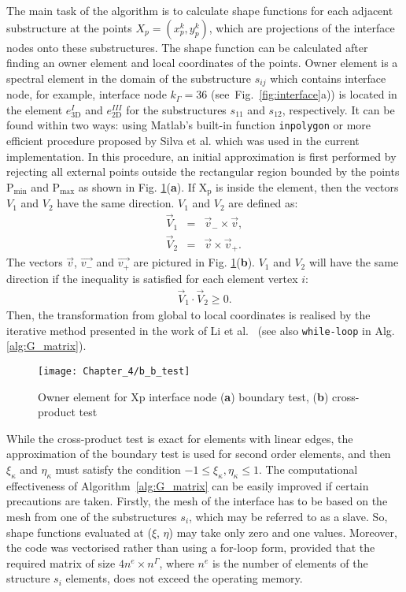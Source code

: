 The main task of the algorithm is to calculate shape functions for each adjacent substructure at the points \(X_p=(x_p^k,y_p^k)\), which are projections of the interface nodes onto these substructures.
The shape function can be calculated after finding an owner element and local coordinates of the points.
Owner element is a spectral element in the domain of the substructure \(s_{ij}\) which contains interface node, for example, interface node \(k_\Gamma=36\) (see~Fig.~\ref{fig:interface}a)) is located in the element \(e^{I}_{3\mathrm{D}}\) and \(e^{III}_{2\mathrm{D}}\) for the substructures \(s_{11}\) and \(s_{12}\), respectively.
It can be found within two ways: using Matlab's built-in function \verb+inpolygon+ or more efficient procedure proposed by Silva et al. \cite{silva2009exact} which was used in the current implementation.
In this procedure, an initial approximation is first performed by rejecting all external points outside the rectangular region bounded by the points \(\mathrm{P_{min}}\) and \(\mathrm{P_{max}}\) as shown in Fig. \ref{fig:b_b_test}(\textbf{a}).
If \(\mathrm{X_p}\) is inside the element, then the vectors \(V_1\) and \(V_2\) have the same direction.
\(V_1\) and \(V_2\) are defined as:
\begin{eqnarray}
	\vec{V}_1 & = & \vec{v}_-\times \vec{v},\\
	\vec{V}_2 & = & \vec{v}\times \vec{v}_+.
\label{eq:v_vectors}
\end{eqnarray}
The vectors \(\vec{v}\), \(\vec{v_-}\) and \(\vec{v_+}\) are pictured in Fig. \ref{fig:b_b_test}(\textbf{b}). \(V_1\) and \(V_2\) will have the same direction if the inequality is satisfied for each element vertex \(i\):
\begin{eqnarray}
		\vec{V}_1 \cdot \vec{V}_2 \geq0.
	\label{eq:dot_prod}
\end{eqnarray}
Then, the transformation from global to local coordinates is realised by the iterative method presented in the work of Li et al.~\cite{li2014efficient} (see also \verb+while-loop+ in Alg. \ref{alg:G_matrix}).
\begin{figure}[H]
	\begin{center}
		\texttt{[image: Chapter\_4/b\_b\_test]}
	\end{center}
	\caption{Owner element for Xp interface node (\textbf{a}) boundary test, (\textbf{b}) cross-product test}
	\label{fig:b_b_test}
\end{figure}
While the cross-product test is exact for elements with linear edges, the approximation of the boundary test is used for second order elements, and then \(\xi_{\kappa}\) and \(\eta_{\kappa}\) must satisfy the condition \(-1\leq \xi_{\kappa},\eta_{\kappa} \leq 1\).
The computational effectiveness of Algorithm~\ref{alg:G_matrix} can be easily improved if certain precautions are taken.
Firstly, the mesh of the interface has to be based on the mesh from one of the substructures \(s_{i}\), which may be referred to as a slave.
So, shape functions evaluated at (\(\xi\), \(\eta\)) may take only zero and one values.
Moreover, the code was vectorised rather than using a for-loop form, provided that the required matrix of size \(4n^e\times n^{\Gamma}\), where \(n^e\) is the number of elements of the structure \(s_i\) elements, does not exceed the operating memory.